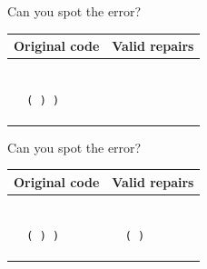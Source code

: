 \documentclass{beamer}
\begin{document}
  \begin{frame}[fragile]{Can you spot the error?}
  \begin{center}
  \begin{tabular}{|m{5.5cm}|m{5.5cm}|}
  \hline \rule{0pt}{2.5ex}\textbf{Original code}\rule[-1ex]{0pt}{2ex} &  \rule{0pt}{2.5ex}\textbf{Valid repairs}\rule[-1ex]{0pt}{2ex} \\\hline
  \begin{lstlisting}[escapechar=!, basicstyle=\linespread{1.3}\ttfamily\footnotesize]

  ( ) )

  \end{lstlisting} & \begin{lstlisting}[escapechar=!, basicstyle=\linespread{1.3}\ttfamily\footnotesize]

  \end{lstlisting} \\\hline
  \end{tabular}
  \end{center}
  \end{frame}

  \begin{frame}[fragile]{Can you spot the error?}
  \begin{center}
  \begin{tabular}{|m{5.5cm}|m{5.5cm}|}
  \hline \rule{0pt}{2.5ex}\textbf{Original code}\rule[-1ex]{0pt}{2ex} &  \rule{0pt}{2.5ex}\textbf{Valid repairs}\rule[-1ex]{0pt}{2ex} \\\hline
  \begin{lstlisting}[escapechar=!, basicstyle=\linespread{1.3}\ttfamily\footnotesize]

  ( ) )

  \end{lstlisting} & \begin{lstlisting}[escapechar=!, basicstyle=\linespread{1.3}\ttfamily\footnotesize]

  ( )

  \end{lstlisting} \\\hline
  \end{tabular}
  \end{center}
  \end{frame}
\end{document}
